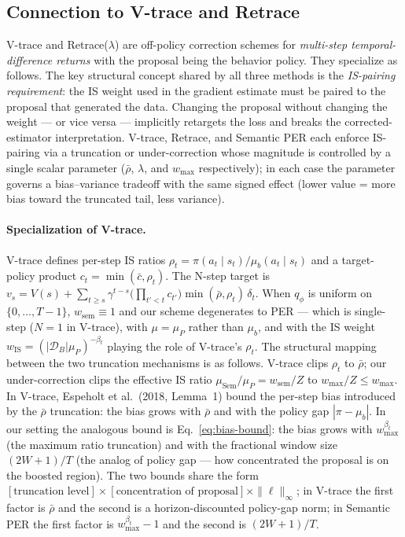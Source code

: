 \subsection{Connection to V-trace and Retrace}
\label{app:vtrace}

V-trace \citep{espeholt2018impala} and Retrace($\lambda$)
\citep{munos2016retrace} are off-policy correction schemes for
\emph{multi-step temporal-difference returns} with the proposal
being the behavior policy. They specialize as follows.
The key structural concept shared by all three methods is the
\emph{IS-pairing requirement}: the IS weight used in the gradient
estimate must be paired to the proposal that generated the data.
Changing the proposal without changing the weight --- or vice versa ---
implicitly retargets the loss and breaks the corrected-estimator
interpretation. V-trace, Retrace, and Semantic PER each enforce IS-pairing
via a truncation or under-correction whose magnitude is controlled by a
single scalar parameter ($\bar\rho$, $\lambda$, and $w_{\max}$
respectively); in each case the parameter governs a bias--variance
tradeoff with the same signed effect (lower value = more bias toward
the truncated tail, less variance).

\paragraph{Specialization of V-trace.}
V-trace defines per-step IS ratios $\rho_t = \pi(a_t\!\mid\!s_t)/\mu_b(a_t\!\mid\!s_t)$
and a target-policy product $c_t = \min(\bar c, \rho_t)$. The N-step
target is
$v_s = V(s) + \sum_{t\ge s}\gamma^{t-s}\bigl(\prod_{t'<t}c_{t'}\bigr) \min(\bar\rho,\rho_t)\,
\delta_t$. When $q_\phi$ is uniform on $\{0,\dots,T-1\}$, $w_{\text{sem}}\equiv 1$
and our scheme degenerates to PER --- which is single-step
($N\!=\!1$ in V-trace), with $\mu=\mu_P$ rather than $\mu_b$, and with
the IS weight $w_{\text{IS}}=(|\mathcal{D}_B|\mu_P)^{-\beta_t}$ playing
the role of V-trace's $\rho_t$.
The structural mapping between the two truncation mechanisms is as follows.
V-trace clips $\rho_t$ to $\bar\rho$; our under-correction clips the
effective IS ratio $\mu_{\text{Sem}}/\mu_P = w_{\text{sem}}/Z$ to
$w_{\max}/Z\!\le\! w_{\max}$. In V-trace, Espeholt et al.\ (2018, Lemma~1)
bound the per-step bias introduced by the $\bar\rho$ truncation: the
bias grows with $\bar\rho$ and with the policy gap $|\pi-\mu_b|$.
In our setting the analogous bound is Eq.~\eqref{eq:bias-bound}: the
bias grows with $w_{\max}^{\beta_t}$ (the maximum ratio truncation) and
with the fractional window size $(2W+1)/T$ (the analog of policy gap ---
how concentrated the proposal is on the boosted region). The two bounds
share the form $[\text{truncation level}]\times[\text{concentration of
proposal}]\times\|\ell\|_\infty$; in V-trace the first factor is $\bar\rho$
and the second is a horizon-discounted policy-gap norm; in Semantic PER
the first factor is $w_{\max}^{\beta_t}-1$ and the second is
$(2W+1)/T$.

